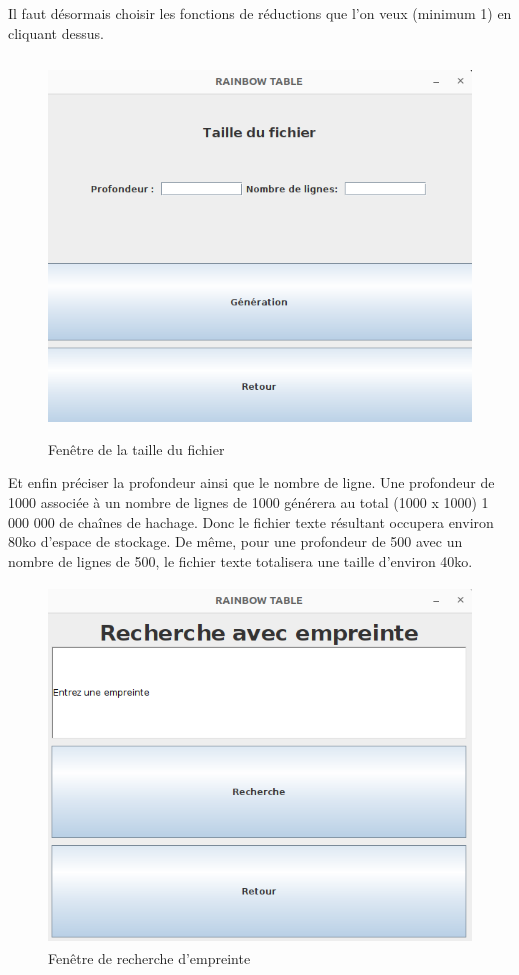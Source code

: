 \documentclass[a4paper,12pt]{article}
\begin{document}
    Il faut désormais choisir les fonctions de réductions que l'on veux (minimum 1) en cliquant dessus.
    \begin{figure}[H]
    \centering
    \includegraphics[height=10cm]{img/interface_taille.png}
    \caption{Fenêtre de la taille du fichier}
    \end{figure}
    Et enfin préciser la profondeur ainsi que le nombre de ligne. Une profondeur de 1000 associée à un nombre de lignes de 1000 générera au total (1000 x 1000) 1 000 000 de chaînes de hachage. Donc le fichier texte résultant occupera environ 80ko d'espace de stockage. De même, pour une profondeur de 500 avec un nombre de lignes de 500, le fichier texte totalisera une taille d'environ 40ko.
    \begin{figure}[H]
    \centering
    \includegraphics[height=9.5cm]{img/interface_recherche.png}
    \caption{Fenêtre de recherche d'empreinte}
    \end{figure}
\end{document}
